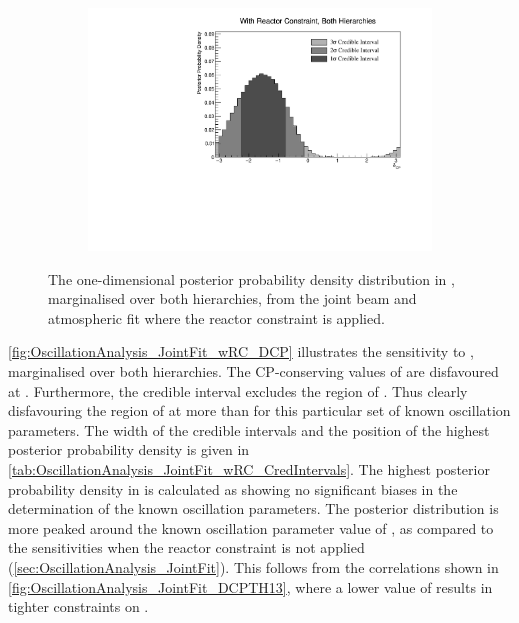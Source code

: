 \begin{figure}[h]
  \begin{subfigure}[t]{0.98\textwidth}
    \includegraphics[width=\textwidth, trim={0mm 0mm 0mm 0mm}, clip,page=1]{Figures/OA/JointFit_wRC/Contours_1D_dcp_BH_1_wRC_UnSmeared_CredibleInterval.pdf}
  \end{subfigure}
  \caption{The one-dimensional posterior probability density distribution in , marginalised over both hierarchies, from the joint beam and atmospheric fit where the reactor constraint is applied.}
  \label{fig:OscillationAnalysis_JointFit_wRC_DCP}
\end{figure}

\autoref{fig:OscillationAnalysis_JointFit_wRC_DCP} illustrates the sensitivity to , marginalised over both hierarchies. The CP-conserving values of  are disfavoured at \quickmath{2\sigma}. Furthermore, the \quickmath{3\sigma} credible interval excludes the region of . Thus clearly disfavouring the region of  at more than \quickmath{3\sigma} for this particular set of known oscillation parameters. The width of the \quickmath{1\sigma} credible intervals and the position of the highest posterior probability density is given in \autoref{tab:OscillationAnalysis_JointFit_wRC_CredIntervals}. The highest posterior probability density in  is calculated as  showing no significant biases in the determination of the known oscillation parameters. The posterior distribution is more peaked around the known oscillation parameter value of , as compared to the sensitivities when the reactor constraint is not applied (\autoref{sec:OscillationAnalysis_JointFit}). This follows from the correlations shown in \autoref{fig:OscillationAnalysis_JointFit_DCPTH13}, where a lower value of  results in tighter constraints on . 


